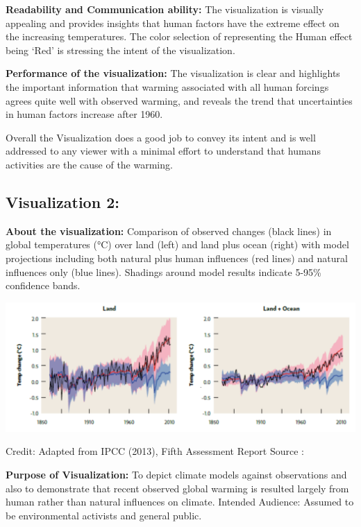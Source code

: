 \documentclass[]{book}
\begin{document}
\textbf{Readability and Communication ability:} The visualization is visually appealing and provides insights that human factors have the extreme effect on the increasing temperatures. The color selection of representing the Human effect being `Red' is stressing the intent of the visualization.

\textbf{Performance of the visualization:} The visualization is clear and highlights the important information that warming associated with all human forcings agrees quite well with observed warming, and reveals the trend that uncertainties in human factors increase after 1960.

Overall the Visualization does a good job to convey its intent and is well addressed to any viewer with a minimal effort to understand that humans activities are the cause of the warming.

\hypertarget{visualization-2}{%
\subsection{Visualization 2:}\label{visualization-2}}

\textbf{About the visualization:} Comparison of observed changes (black lines) in global temperatures (°C) over land (left) and land plus ocean (right) with model projections including both natural plus human influences (red lines) and natural influences only (blue lines). Shadings around model results indicate 5-95\% confidence bands.

\includegraphics{_images/Vz3-LandOcean.png}

Credit: Adapted from IPCC (2013), Fifth Assessment Report
Source : \citep{Land_Ocean}

\textbf{Purpose of Visualization:} To depict climate models against observations and also to demonstrate that recent observed global warming is resulted largely from human rather than natural influences on climate.
Intended Audience: Assumed to be environmental activists and general public.
\end{document}
